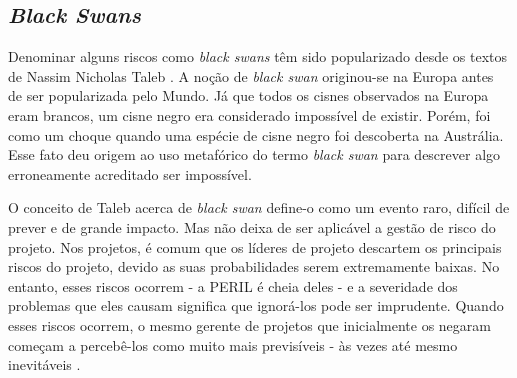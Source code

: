 \subsection{\textit{Black Swans}}

Denominar alguns riscos como \textit{black swans} têm sido popularizado desde os textos de Nassim Nicholas Taleb \cite{taleb2001fooled}. A noção de \textit{black swan} originou-se na Europa antes de ser popularizada pelo Mundo. Já que todos os cisnes observados na Europa eram brancos, um cisne negro era considerado impossível de existir. Porém, foi como um choque quando uma espécie de cisne negro foi descoberta na Austrália. Esse fato deu origem ao uso metafórico do termo \textit{black swan} para descrever algo erroneamente acreditado ser impossível.

O conceito de Taleb acerca de \textit{black swan} define-o como um evento raro, difícil de prever e de grande impacto. Mas não deixa de ser aplicável a gestão de risco do projeto. Nos projetos, é comum que os líderes de projeto descartem os principais riscos do projeto, devido as suas probabilidades serem extremamente baixas. No entanto, esses riscos ocorrem - a PERIL é cheia deles - e a severidade dos problemas que eles causam significa que ignorá-los pode ser imprudente. Quando esses riscos ocorrem, o mesmo gerente de projetos que inicialmente os negaram começam a percebê-los como muito mais previsíveis - às vezes até mesmo inevitáveis \cite{KEND2003BOOK}.

